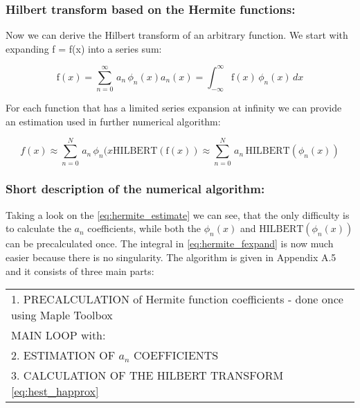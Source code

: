 \documentclass[12pt,twoside,a4paper]{article}
\numberwithin{equation}{subsection}
\numberwithin{figure}{subsection}
\begin{document}
\subsubsection*{Hilbert transform based on the Hermite functions:}

Now we can derive the Hilbert transform of an arbitrary function. We start with expanding f = f(x) into a series sum:

\begin{subequations} \label{eq:hermite_fexpand}
  \begin{equation}   \label{eq:hfe_f}
     \mathrm{f}(x)=\sum_{n=0}^{\infty }\,{a_{n}}\,{\phi_{n}}(x) 
  \end{equation}
  \begin{equation}   \label{eq:hfe_an}
     {a_{n}}(x)=\int_{ - \infty }^{\infty }\mathrm{f}(x)\,{\phi_{n}}(x)\,dx
  \end{equation}
\end{subequations}

For each function that has a limited series expansion at infinity we can provide an estimation used in further numerical algorithm:

\begin{subequations} \label{eq:hermite_estimate}
  \begin{equation}   \label{eq:hest_fapprox}
      f(x) \approx \sum_{n=0}^{N}\,{a_{n}}\,{\phi_{n}}(x
  \end{equation}
  \begin{equation}   \label{eq:hest_happrox}
     \mathrm{HILBERT}(\mathrm{f}(x)) \approx \sum_{n=0}^{N}\,{a_{n}}\,\mathrm{HILBERT}({\phi_{n}}(x))
  \end{equation}
\end{subequations}

\subsubsection*{Short description of the numerical algorithm:}

Taking a look on the \ref{eq:hermite_estimate} we can see, that the only difficulty is to calculate the ${a_{n}}$ coefficients,
while both the ${\phi_{n}}(x)$ and $\mathrm{HILBERT}({\phi_{n}}(x))$ can be precalculated once. The integral in
\ref{eq:hermite_fexpand} is now much easier because there is no singularity. The algorithm is given in Appendix A.5 and it
consists of three main parts:


\begin{tabular}{l}
  1. PRECALCULATION of Hermite function coefficients - done once using Maple Toolbox \\
  MAIN LOOP with: \\
  2. ESTIMATION OF ${a_{n}}$ COEFFICIENTS \\
  3. CALCULATION OF THE HILBERT TRANSFORM \ref{eq:hest_happrox} \\
\end{tabular}
\end{document}
